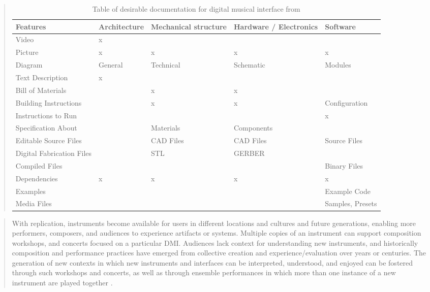 \begin{quotation}
\begin{table}[!ht]
    \centering    
    \begin{tabular}{|l|l|l|l|l|}
    \hline
        Features & Architecture & Mechanical structure & Hardware / Electronics
        & Software \\ \hline
        Video                     & x & ~ & ~ & ~ \\ \hline
        Picture                   & x & x & x & x \\ \hline
        Diagram                   & General & Technical & Schematic & Modules \\
        \hline
        Text Description          & x & ~ & ~ & ~ \\ \hline
        Bill of Materials         & ~ & x & x & ~ \\ \hline
        Building Instructions     & ~ & x & x & Configuration \\ \hline
        Instructions to Run       & ~ & ~ & ~ & x \\ \hline
        Specification About       & ~ & Materials & Components & ~ \\ \hline
        Editable Source Files     & ~ & CAD Files & CAD Files & Source Files \\
        \hline
        Digital Fabrication Files & ~ & STL & GERBER & ~ \\ \hline
        Compiled Files            & ~ & ~ & ~ & Binary Files \\ \hline
        Dependencies              & x & x & x & x \\ \hline
        Examples                  & ~ & ~ & ~ & Example Code \\ \hline
        Media Files               & ~ & ~ & ~ & Samples, Presets \\ \hline
    \end{tabular}    
    \caption{Table of desirable documentation for digital musical interface from
    \cite{calegario_documentation_2021}}
    \label{tab:dmi_documentation}
\end{table}
\end{quotation}

\begin{quotation}
With replication, instruments become available for users in different locations
and cultures and future generations, enabling more performers, composers, and
audiences to experience artifacts or systems. Multiple copies of an instrument
can support composition workshops, and concerts focused on a particular DMI.
Audiences lack context for understanding new instruments, and historically
composition and performance practices have emerged from collective creation and
experience/evaluation over years or centuries. The generation of new contexts in
which new instruments and interfaces can be interpreted, understood, and enjoyed
can be fostered through such workshops and concerts, as well as through ensemble
performances in which more than one instance of a new instrument are played
together .
\end{quotation}

